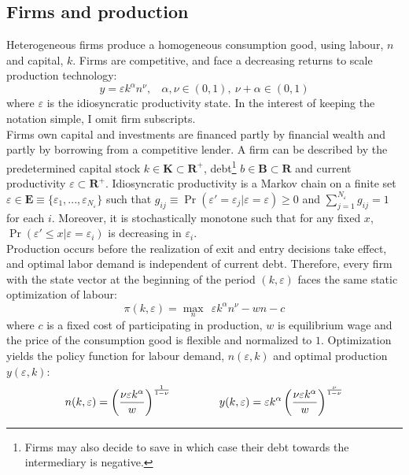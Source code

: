 \documentclass[12pt]{article}
\begin{document}
\subsection{Firms and production \label{sec:production}}
Heterogeneous firms produce a homogeneous consumption good, using labour, $n$ and capital, $k$. Firms are competitive, and face a decreasing returns to scale production technology:
\begin{equation} \label{eq:prodf}
y = \varepsilon k^{\alpha}n^{\nu}, \ \ \ \ \alpha,\nu \in (0,1),  \ \nu + \alpha \in (0,1)
\end{equation}  
where $\varepsilon$ is the idiosyncratic productivity state. In the interest of keeping the notation simple, I omit firm subscripts. \vspace{3mm} \\
Firms own capital and investments are financed partly by financial wealth and partly by borrowing from a competitive lender. A firm can be described by the predetermined capital stock $k \in \mathbf{K} \subset \mathbf{R^{+}}$, debt\footnote{Firms may also decide to save in which case their debt towards the intermediary is negative.} $b \in \mathbf{B} \subset \mathbf{R}$ and current productivity $\varepsilon \subset \mathbf{R^+}$. Idiosyncratic productivity is a Markov chain on a finite set $\varepsilon \in \mathbf{E} \equiv \{ \varepsilon_1,...,\varepsilon_{N_{\varepsilon}} \}$ such that $ g_{ij} \equiv \Pr(\varepsilon'= \varepsilon_j|\varepsilon = \varepsilon) \geq 0$ and $\sum_{j=1}^{N_{\varepsilon}} g_{ij} = 1$ for each $i$. Moreover, it is stochastically monotone such that for any fixed $x$, $\Pr(\varepsilon' \leq x | \varepsilon = \varepsilon_i)$ is decreasing in $\varepsilon_i$. \vspace{3mm} \\
Production occurs before the realization of exit and entry decisions take effect, and optimal labor demand is independent of current debt. Therefore, every firm with the state vector at the beginning of the period $(k,\varepsilon)$ faces the same static optimization of labour: 
$$ \pi(k,\varepsilon) = \max_{n} \ \  \varepsilon k^{\alpha}n^{\nu} - wn - c$$
where $c$ is a fixed cost of participating in production, $w$ is equilibrium wage and the price of the consumption good is flexible and normalized to $1$. Optimization yields the policy function for labour demand, $n(\varepsilon,k)$ and optimal production $y(\varepsilon,k)$: 
\begin{equation} \label{eq:opt_emp_prod}
n(k,\varepsilon) = \left( \dfrac{ \nu \varepsilon k^\alpha}{w} \right)^{\frac{1}{1-\nu}} \hspace{15mm}
y(k,\varepsilon) = \varepsilon k^{\alpha} \left( \dfrac{\nu \varepsilon k^\alpha}{w} \right)^{\frac{\nu}{1-\nu}}
\end{equation}  
\end{document}

